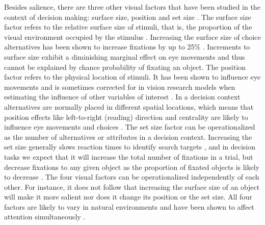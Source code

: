 Besides salience, there are three other visual factors that have been studied in the context of decision making: surface size, position and set size \citep{orquin2013a, wedel2008}. The surface size factor refers to the relative surface size of stimuli, that is, the proportion of the visual environment occupied by the stimulus \citep[for a review see][]{peschel2013a}. Increasing the surface size of choice alternatives has been shown to increase fixations by up to 25\% \citep{chandon2009a}. Increments to surface size exhibit a diminishing marginal effect on eye movements \citep{lohse1997a} and thus cannot be explained by chance probability of fixating an object. The position factor refers to the physical location of stimuli. It has been shown to influence eye movements and is sometimes corrected for in vision research models when estimating the influence of other variables of interest \citep{clarke2014a}. In a decision context alternatives are normally placed in different spatial locations, which means that position effects like left-to-right (reading) direction and centrality are likely to influence eye movements and choices \citep{atalay2012a, meissner2016a}. The set size factor can be operationalized as the number of alternatives or attributes in a decision context. Increasing the set size generally slows reaction times to identify search targets \citep{wolfe2010}, and in decision tasks we expect that it will increase the total number of fixations in a trial, but decrease fixations to any given object as the proportion of fixated objects is likely to decrease \citep{spinks2016a}. The four visual factors can be operationalized independently of each other. For instance, it does not follow that increasing the surface size of an object will make it more salient nor does it change its position or the set size. All four factors are likely to vary in natural environments and have been shown to affect attention simultaneously \citep{gidloef2017a, orquin2019a}. \\

